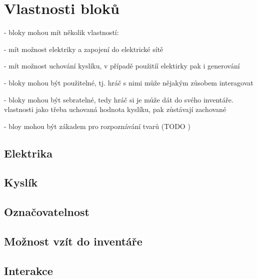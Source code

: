
\section{Vlastnosti bloků}

- bloky mohou mít několik vlastností:

- mít možnost elektriky a zapojení do elektrické sítě

- mít možnost uchování kyslíku, v případě použitíí elektirky pak i generování

- bloky mohou být použitelné, tj. hráč s nimi může nějakým zůsobem interagovat

- bloky mohou být sebratelné, tedy hráč si je může dát do svého inventáře. vlastnosti jako třeba uchovaná hodnota kyslíku, pak zůstávají zachované

- bloy mohou být zákadem pro rozpoznávání tvarů (TODO )

\subsection{Elektrika}


\subsection{Kyslík}


\subsection{Označovatelnost}


\subsection{Možnost vzít do inventáře}

\subsection{Interakce}
